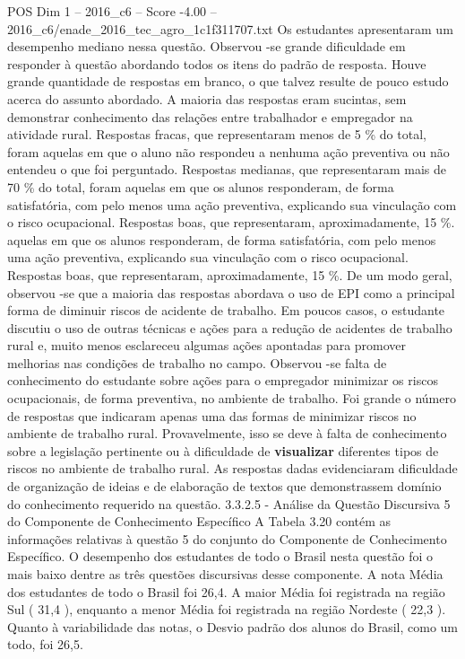 \begin{textsample}{POS Dim 1 – 2016\_c6 – Score -4.00 – 2016\_c6/enade\_2016\_tec\_agro\_1c1f311707.txt}
Os estudantes apresentaram um desempenho mediano nessa questão.
Observou -se grande dificuldade em responder à questão abordando todos os itens do padrão de resposta.
Houve grande quantidade de respostas em branco, o que talvez resulte de pouco estudo acerca do assunto abordado.
A maioria das respostas eram sucintas, sem demonstrar conhecimento das relações entre trabalhador e empregador na atividade rural.
Respostas fracas, que representaram menos de 5 \% do total, foram aquelas em que o aluno não respondeu a nenhuma ação preventiva ou não entendeu o que foi perguntado.
Respostas medianas, que representaram mais de 70 \% do total, foram aquelas em que os alunos responderam, de forma satisfatória, com pelo menos uma ação preventiva, explicando sua vinculação com o risco ocupacional.
Respostas boas, que representaram, aproximadamente, 15 \%. aquelas em que os alunos responderam, de forma satisfatória, com pelo menos uma ação preventiva, explicando sua vinculação com o risco ocupacional.
Respostas boas, que representaram, aproximadamente, 15 \%.
De um modo geral, observou -se que a maioria das respostas abordava o uso de EPI como a principal forma de diminuir riscos de acidente de trabalho.
Em poucos casos, o estudante discutiu o uso de outras técnicas e ações para a redução de acidentes de trabalho rural e, muito menos esclareceu algumas ações apontadas para promover melhorias nas condições de trabalho no campo.
Observou -se falta de conhecimento do estudante sobre ações para o empregador minimizar os riscos ocupacionais, de forma preventiva, no ambiente de trabalho.
Foi grande o número de respostas que indicaram apenas uma das formas de minimizar riscos no ambiente de trabalho rural.
Provavelmente, isso se deve à falta de conhecimento sobre a legislação pertinente ou à dificuldade de \textbf{visualizar} diferentes tipos de riscos no ambiente de trabalho rural.
As respostas dadas evidenciaram dificuldade de organização de ideias e de elaboração de textos que demonstrassem domínio do conhecimento requerido na questão. 3.3.2.5 - Análise da Questão Discursiva 5 do Componente de Conhecimento Específico A Tabela 3.20 contém as informações relativas à questão 5 do conjunto do Componente de Conhecimento Específico.
O desempenho dos estudantes de todo o Brasil nesta questão foi o mais baixo dentre as três questões discursivas desse componente.
A nota Média dos estudantes de todo o Brasil foi 26,4.
A maior Média foi registrada na região Sul ( 31,4 ), enquanto a menor Média foi registrada na região Nordeste ( 22,3 ).
Quanto à variabilidade das notas, o Desvio padrão dos alunos do Brasil, como um todo, foi 26,5.

\end{textsample}
